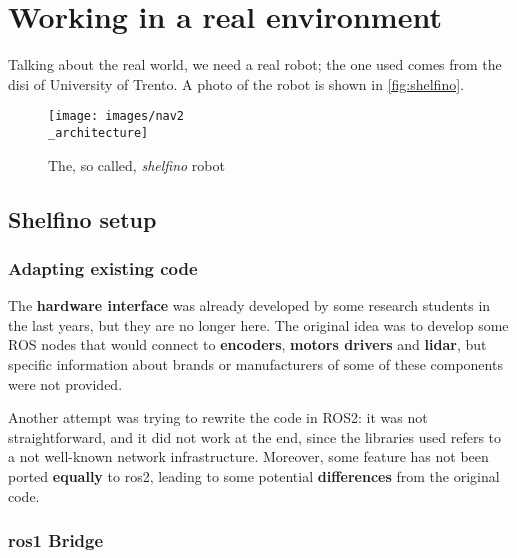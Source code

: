   

\chapter{Working in a real environment}
\label{cha:realworld}

Talking about the real world, we need a real robot; the one used comes from the \acrfull{disi} of University of Trento.
A photo of the robot is shown in \autoref{fig:shelfino}. %

\begin{figure}[h]
  \centering
  \texttt{[image: images/nav2\\\_architecture]}
  \caption{The, so called, \textit{shelfino} robot}
  \label{fig:shelfino}
\end{figure}

\section{Shelfino setup} 

\subsection{Adapting existing code}

The \textbf{hardware interface} was already developed by some research students in the last years, but they are no longer here. The original idea was to develop some ROS nodes that would connect to \textbf{encoders}, \textbf{motors drivers} and \textbf{lidar}, but specific information about brands or manufacturers of some of these components were not provided.

Another attempt was trying to rewrite the code in ROS2: it was not straightforward, and it did not work at the end, since the libraries used refers to a not well-known network infrastructure. Moreover, some feature has not been ported \textbf{equally} to \acrshort{ros}2, leading to some potential \textbf{differences} from the original code.

\subsection{\acrshort{ros}1 Bridge}

